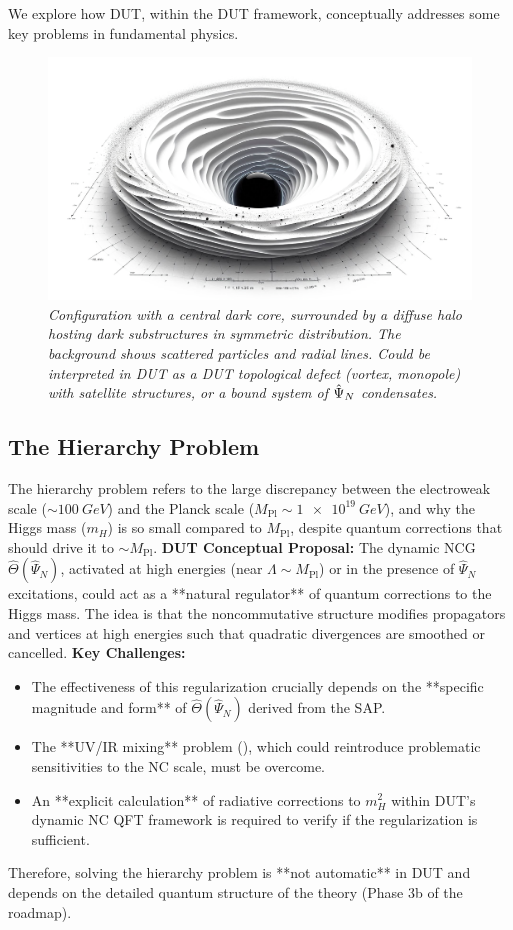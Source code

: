 \documentclass[11pt, a4paper]{article}
\theoremstyle{remark}
\newcommand{\Op}[1]{\hat{#1}}
\newcommand{\Mpl}{M_{\mathrm{Pl}}}
\begin{document}
We explore how DUT, within the DUT framework, conceptually addresses some key problems in fundamental physics.

\begin{figure}[htbp]
    \centering
    \includegraphics[width=0.6\linewidth]{OIG27.ZNLJ.PNG}
    \caption{%
     \footnotesize\textit{Configuration with a central dark core, surrounded by a diffuse halo hosting dark substructures in symmetric distribution. The background shows scattered particles and radial lines. Could be interpreted in DUT as a DUT topological defect (vortex, monopole) with satellite structures, or a bound system of \(\protect\Op{\Psi}_N\) condensates.}
    }
    \label{fig:Figura9}
\end{figure}

\subsection{The Hierarchy Problem}
\label{sec:problema_jerarquia_final}
The hierarchy problem refers to the large discrepancy between the electroweak scale (\( \sim \SI{100}{GeV} \)) and the Planck scale (\( \Mpl \sim \SI{1e19}{GeV} \)), and why the Higgs mass (\( m_H \)) is so small compared to \( \Mpl \), despite quantum corrections that should drive it to \( \sim \Mpl \).
\textbf{DUT Conceptual Proposal:} The dynamic NCG \( \Op{\Theta}(\Op{\Psi}_N) \), activated at high energies (near \( \Lambda \sim \Mpl \)) or in the presence of \( \Op{\Psi}_N \) excitations, could act as a **natural regulator** of quantum corrections to the Higgs mass. The idea is that the noncommutative structure modifies propagators and vertices at high energies such that quadratic divergences are smoothed or cancelled.
\textbf{Key Challenges:}
\begin{itemize}
    \item The effectiveness of this regularization crucially depends on the **specific magnitude and form** of \( \Op{\Theta}(\Op{\Psi}_N) \) derived from the SAP.
    \item The **UV/IR mixing** problem (), which could reintroduce problematic sensitivities to the NC scale, must be overcome.
    \item An **explicit calculation** of radiative corrections to \( m_H^2 \) within DUT's dynamic NC QFT framework is required to verify if the regularization is sufficient.
\end{itemize}
Therefore, solving the hierarchy problem is **not automatic** in DUT and depends on the detailed quantum structure of the theory (Phase 3b of the roadmap).
\end{document}
